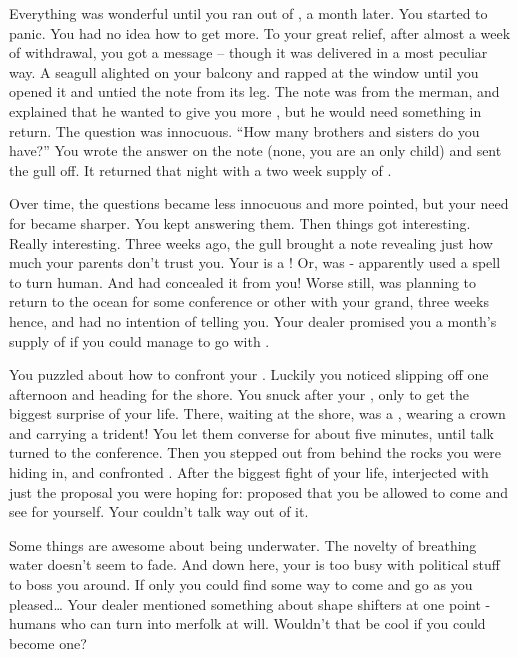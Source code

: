 \documentclass[char]{NeptuneBall}
\begin{document}
Everything was wonderful until you ran out of \iDrug{\MYname}, a month later. You started to panic. You had no idea how to get more. To your great relief, after almost a week of withdrawal, you got a message -- though it was delivered in a most peculiar way. A seagull alighted on your balcony and rapped at the window until you opened it and untied the note from its leg. The note was from the merman, and explained that he wanted to give you more \iDrug{\MYname}, but he would need something in return.  The question was innocuous. ``How many brothers and sisters do you have?'' You wrote the answer on the note (none, you are an only child) and sent the gull off. It returned that night with a two week supply of \iDrug{\MYname}.

Over time, the questions became less innocuous and more pointed, but your need for \iDrug{\MYname} became sharper. You kept answering them. Then things got interesting. Really interesting. Three weeks ago, the gull brought a note revealing just how much your parents don't trust you. Your \cAriel{\parent} \cAriel{} is a \cAriel{\mer}! Or, was - apparently \cAriel{\they} used a spell to turn \cAriel{\themself} human. And \cAriel{\they} had concealed it from you! Worse still, \cAriel{} was planning to return to the ocean for some conference or other with your grand\cKing{\parent}, three weeks hence, and had no intention of telling you. Your dealer promised you a month's supply of \iDrug{\MYname} if you could manage to go with \cAriel{\them}.

You puzzled about how to confront your \cAriel{\parent}. Luckily you noticed \cAriel{\them} slipping off one afternoon and heading for the shore. You snuck after your \cAriel{\parent}, only to get the biggest surprise of your life. There, waiting at the shore, was a \cKing{\mer}, wearing a crown and carrying a trident! You let them converse for about five minutes, until talk turned to the conference. Then you stepped out from behind the rocks you were hiding in, and confronted \cAriel{}. After the biggest fight of your life, \cKing{} interjected with just the proposal you were hoping for: \cKing{\they} proposed that you be allowed to come and see \pAtlantis{} for yourself. Your \cAriel{\parent} couldn't talk \cAriel{\their} way out of it.

Some things are awesome about being underwater. The novelty of breathing water doesn't seem to fade. And down here, your \cAriel{\parent} is too busy with political stuff to boss you around. If only you could find some way to come and go as you pleased\ldots{} Your dealer mentioned something about shape shifters at one point - humans who can turn into merfolk at will. Wouldn't that be cool if you could become one?
\end{document}
